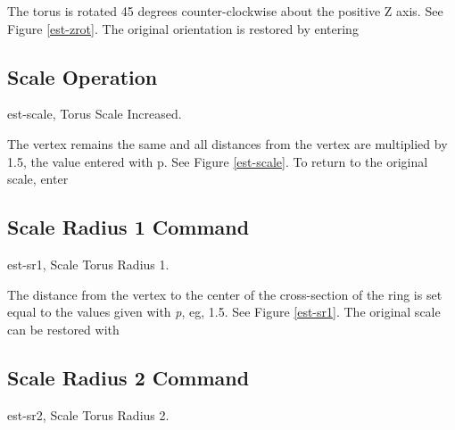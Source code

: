 
The torus is rotated 45 degrees counter-clockwise about the positive Z axis.
See Figure \ref{est-zrot}.
The original orientation is restored by entering


\subsection{Scale Operation}
\mfig est-scale, Torus Scale Increased.


The vertex remains the same and all distances from the vertex are
multiplied by 1.5, the value entered with p.  See Figure \ref{est-scale}.
To return to the original scale, enter


\subsection{Scale Radius 1 Command}
\mfig est-sr1, Scale Torus Radius 1.


The distance from the vertex to the center of the cross-section of the
ring is set equal to the values given with {\em p}, eg, 1.5.
See Figure \ref{est-sr1}.
The original scale can be restored with


\subsection{Scale Radius 2 Command}
\mfig est-sr2, Scale Torus Radius 2.


